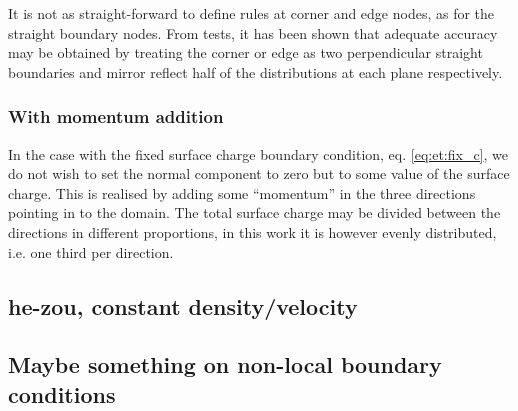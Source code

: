It is not as straight-forward to define rules at corner and edge
nodes, as for the straight boundary nodes. From tests, it has been
shown that adequate accuracy may be obtained by treating the corner or
edge as two perpendicular straight boundaries and mirror reflect half
of the distributions at each plane respectively. 

\subsubsection{With momentum addition}\label{sec:lbm:mod_mirror}
In the case with the fixed surface charge boundary condition,
eq. \eqref{eq:et:fix_c}, we do not wish to set the normal component to
zero but to some value of the surface charge. This is realised by
adding some ``momentum'' in the three directions pointing in to the
domain. The total surface charge may be divided between the directions
in different proportions, in this work it is however evenly
distributed, i.e. one third per direction. 

\subsection{he-zou, constant density/velocity}\label{sec:lbm:hezou}

\subsection{Maybe something on non-local boundary conditions}
